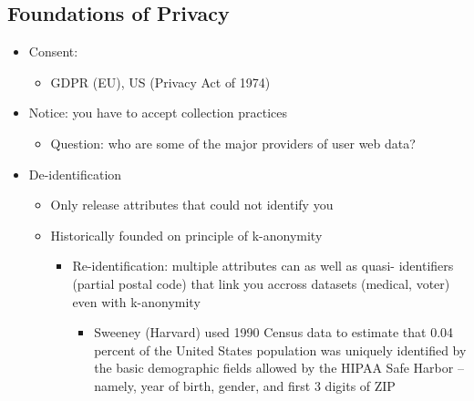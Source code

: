\documentclass[11pt]{article}
\theoremstyle{definition}
\begin{document}
\subsection{Foundations of Privacy}
\begin{itemize}
    \item Consent:
    \begin{itemize}
        \item GDPR (EU), US (Privacy Act of 1974)
    \end{itemize} 
    \item Notice: you have to accept collection practices
    \begin{itemize}
        \item Question: who are some of the major providers of user web data?
    \end{itemize}
    \item De-identification
    \begin{itemize}
        \item Only release attributes that could not identify you
        \item Historically founded on principle of k-anonymity
        \begin{itemize}
            \item Re-identification: multiple attributes can as well as quasi-
            identifiers (partial postal code) that link you accross datasets
            (medical, voter) even with k-anonymity
            \begin{itemize}
                \item Sweeney (Harvard) used 1990 Census data to estimate that 0.04
                percent of the United States population was uniquely identified
                by the basic demographic fields allowed by the HIPAA Safe
                Harbor – namely, year of birth, gender, and first 3 digits of ZIP
            \end{itemize}
        \end{itemize}
    \end{itemize}
\end{itemize}
\end{document}
